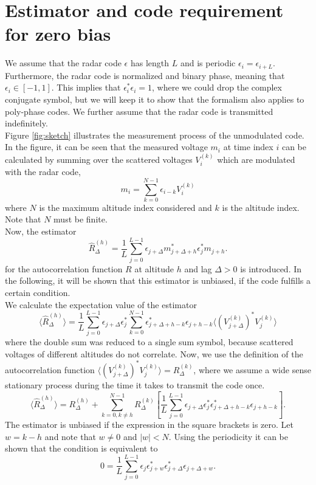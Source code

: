 \documentclass[18pt,a4paper]{extarticle}
\begin{document}
\section{Estimator and code requirement for zero bias}
We assume that the radar code $\epsilon$ has length $L$ and is periodic $\epsilon_i = \epsilon_{i + L}$.
Furthermore, the radar code is normalized and binary phase, meaning that $\epsilon_i \in [-1, 1]$.
This implies that $\epsilon_i^*\epsilon_i = 1$, where we could drop the complex conjugate symbol, but we will keep it to show that the formalism also applies to poly-phase codes.
We further assume that the radar code is transmitted indefinitely.\\
Figure \ref{fig:sketch} illustrates the measurement process of the unmodulated code.
In the figure, it can be seen that the measured voltage $m_i$ at time index $i$ can be calculated by summing over the scattered voltages $V^{(k)}_i$ which are modulated with the radar code,
\begin{equation}
m_i = \sum_{k=0}^{N-1} \epsilon_{i-k} V^{(k)}_i
\end{equation}
where $N$ is the maximum altitude index considered and $k$ is the altitude index.
Note that $N$ must be finite.\\
Now, the estimator
\begin{equation}
\hat{R}^{(h)}_\Delta = \frac{1}{L}\sum^{L-1}_{j=0}\epsilon_{j + \Delta}m_{j + \Delta + h}^* \epsilon_j^*m_{j + h}.
\end{equation}
for the autocorrelation function $R$ at altitude $h$ and lag $\Delta > 0$ is introduced.
In the following, it will be shown that this estimator is unbiased, if the code fulfills a certain condition.\\
We calculate the expectation value of the estimator
\begin{equation}
\langle \hat{R}^{(h)}_\Delta \rangle
=\frac{1}{L}\sum^{L - 1}_{j=0} \epsilon_{j + \Delta}\epsilon_j^* \sum_{k=0}^{N-1} \epsilon_{j+\Delta+h-k}^*\epsilon_{j+h-k} \langle (V^{(k)}_{j + \Delta})^*V^{(k)}_j \rangle
\end{equation}
where the double sum was reduced to a single sum symbol, because scattered voltages of different altitudes do not correlate.
Now, we use the definition of the autocorrelation function $\langle (V_{j+\Delta}^{(k)})^* V_j^{(k)} \rangle = R^{(k)}_\Delta$, where we assume a wide sense stationary process during the time it takes to transmit the code once.
\begin{equation}
\langle \hat{R}^{(h)}_\Delta \rangle
= R^{(h)}_\Delta + \sum_{k=0,k\neq h}^{N-1}R^{(k)}_\Delta
\left[ \frac{1}{L}\sum^{L-1}_{j=0}\epsilon_{j + \Delta}\epsilon_j^* \epsilon_{j+\Delta+h-k}^*\epsilon_{j+h-k}\right].
\end{equation}
The estimator is unbiased if the expression in the square brackets is zero.
Let $w = k - h$ and note that $w \neq 0$ and $|w| < N$.
Using the periodicity it can be shown that the condition is equivalent to
\begin{equation}
0 = \frac{1}{L}\sum^{L-1}_{j=0}\epsilon_{j}\epsilon_{j+w}^* \epsilon_{j+\Delta}^*\epsilon_{j + \Delta + w}.
\label{eq:cond}
\end{equation}
\end{document}
